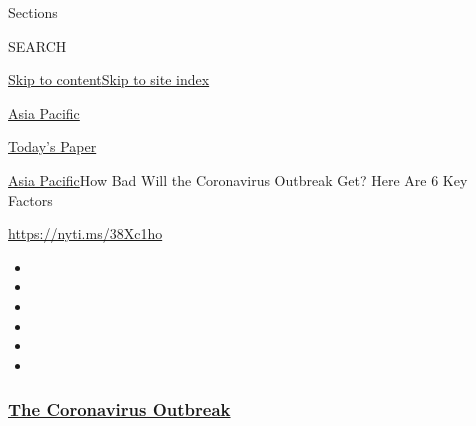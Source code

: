 Sections

SEARCH

\protect\hyperlink{site-content}{Skip to
content}\protect\hyperlink{site-index}{Skip to site index}

\href{https://www.nytimes3xbfgragh.onion/section/world/asia}{Asia
Pacific}

\href{https://myaccount.nytimes3xbfgragh.onion/auth/login?response_type=cookie\&client_id=vi}{}

\href{https://www.nytimes3xbfgragh.onion/section/todayspaper}{Today's
Paper}

\href{/section/world/asia}{Asia Pacific}\textbar{}How Bad Will the
Coronavirus Outbreak Get? Here Are 6 Key Factors

\url{https://nyti.ms/38Xc1ho}

\begin{itemize}
\item
\item
\item
\item
\item
\item
\end{itemize}

\hypertarget{the-coronavirus-outbreak}{%
\subsubsection{\texorpdfstring{\href{https://www.nytimes3xbfgragh.onion/news-event/coronavirus?name=styln-coronavirus-national\&region=TOP_BANNER\&variant=undefined\&block=storyline_menu_recirc\&action=click\&pgtype=Interactive\&impression_id=d885a9f0-e387-11ea-b8ef-a3e158d39ea6}{The
Coronavirus
Outbreak}}{The Coronavirus Outbreak}}\label{the-coronavirus-outbreak}}

